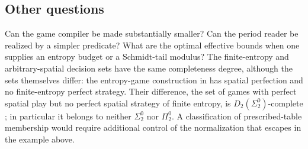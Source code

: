 \subsection{Other questions}\label{sec:otherquestions}
Can the game compiler be made substantially smaller? Can the period reader be realized by a simpler predicate? What are the optimal effective bounds when one supplies an entropy budget or a Schmidt-tail modulus? The finite-entropy and arbitrary-spatial decision sets have the same completeness degree, although the sets themselves differ: the entropy-game construction in \cite{Entropy} has spatial perfection and no finite-entropy perfect strategy. Their difference, the set of games with perfect spatial play but no perfect spatial strategy of finite entropy, is $D_2(\Sigma^0_2)$-complete \cite[Corollary~9.2]{TypeLadder}; in particular it belongs to neither $\Sigma^0_2$ nor $\Pi^0_2$. A classification of prescribed-table membership would require additional control of the normalization that escapes in the example above.
